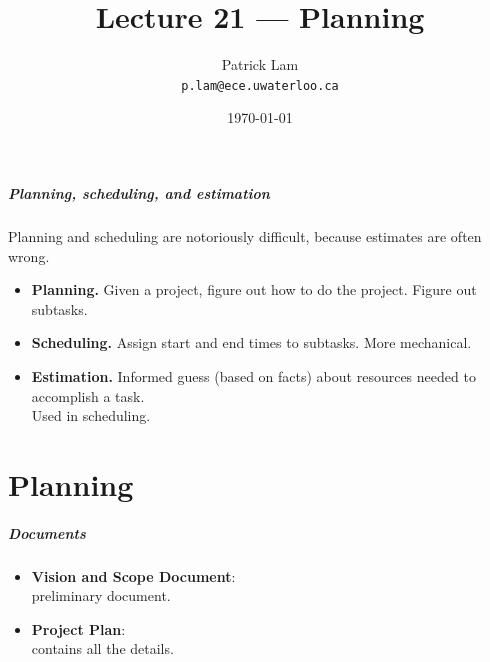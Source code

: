 

\title{Lecture 21 --- Planning}

\author{Patrick Lam \\ \small \texttt{p.lam@ece.uwaterloo.ca}}
\date{\today}




\begin{frame}
  \titlepage
\end{frame}


\begin{frame}
\frametitle{Planning, scheduling, and estimation}

\begin{changemargin}{1cm}
Planning and scheduling are notoriously difficult, because estimates
are often wrong.

\begin{itemize}
\item {\bf Planning.} Given a project, figure out \alert{how} to do the
project. Figure out subtasks.\\[1em]
\item {\bf Scheduling.} Assign \alert{start} and \alert{end times} to subtasks. More mechanical. \\[1em]
\item {\bf Estimation.} Informed guess (based on facts) about \alert{resources
needed} to accomplish a task. \\ Used in scheduling.
\end{itemize}
\end{changemargin}

\end{frame}

\part{Planning}
\frame{\partpage}


\begin{frame}
\frametitle{Documents}

\Large
\begin{changemargin}{1cm}
\begin{itemize}
\item {\bf Vision and Scope Document}: \\ \qquad preliminary document.
\item {\bf Project Plan}: \\ \qquad  contains all the details.
\end{itemize}
\end{changemargin}

\end{frame}

